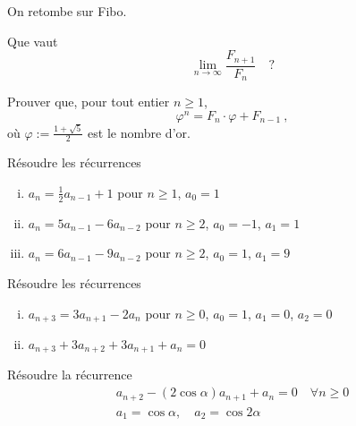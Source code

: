 On retombe sur Fibo.


\begin{exo} 
Que vaut
$$
\lim_{n \to \infty} \frac{F_{n+1}}{F_n} \quad ?
$$
\end{exo}


\begin{exo} 
Prouver que, pour tout entier $n \geqslant 1$, 
$$
\varphi^n = F_n \cdot \varphi + F_{n-1}\ ,
$$
o\`u $\varphi := \frac{1+\sqrt{5}}{2}$ est le {\DEF nombre d'or}.
\end{exo}


\begin{exo}
R\'esoudre les r\'ecurrences 
%
\begin{enumerate}[(i)]
\item $a_n = \frac{1}{2} a_{n-1} + 1$ pour $n \geqslant 1$,\hfill
 $a_0 = 1$

\item $a_n = 5a_{n-1} - 6a_{n-2}$ pour $n \geqslant 2$,\hfill
 $a_0 = -1$, \quad $a_1 = 1$

\item $a_n = 6a_{n-1} - 9a_{n-2}$ pour $n \geqslant 2$,\hfill
 $a_0 = 1$, \quad $a_1 = 9$

\end{enumerate}
\end{exo}


\begin{exo}
R\'esoudre les r\'ecurrences 
%
\begin{enumerate}[(i)]

\item $a_{n+3} = 3 a_{n+1} - 2 a_{n}$ pour $n \geqslant 0$,\hfill
      $a_0 = 1$, \quad $a_1 = 0$, \quad $a_2 = 0$
      
\item $a_{n+3} + 3 a_{n+2} + 3 a_{n+1} + a_n = 0$

\end{enumerate}
\end{exo}


\begin{exo}
R\'esoudre la r\'ecurrence
$$
\begin{array}{ll}
a_{n+2} - (2 \cos \alpha) a_{n+1} + a_n = 0\quad \forall n \geqslant 0\\
a_1 = \cos \alpha, \quad a_2 = \cos 2 \alpha
\end{array}
$$
\end{exo}

